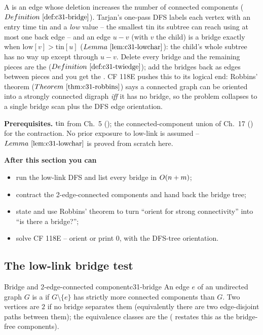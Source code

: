 \begin{topicintro}
A  is an edge whose deletion increases the number of connected
components (\(\defref{c31-bridge}\)).  Tarjan's one-pass DFS labels each vertex
with an entry time \(\mathrm{tin}\) and a \emph{low} value -- the smallest
\(\mathrm{tin}\) its subtree can reach using at most one back edge -- and an edge
\(u\!-\!v\) (with \(v\) the child) is a bridge exactly when
\(\mathrm{low}[v]>\mathrm{tin}[u]\) (\(\lemref{c31-lowchar}\)): the child's whole
subtree has no way up except through \(u\!-\!v\).  Delete every bridge and the
remaining pieces are the 
(\(\defref{c31-twiedge}\)); add the bridges back as edges between pieces and you
get the .  CF 118E pushes this to its logical end: Robbins'
theorem (\(\thmref{c31-robbins}\)) says a connected graph can be oriented into a
strongly connected digraph \emph{iff} it has no bridge, so the problem collapses
to a single bridge scan plus the DFS edge orientation.

\textbf{Prerequisites.} \(\operatorname{tin}\) from Ch.~5 (); the connected-component
union of Ch.~17 () for the contraction.  No prior exposure to
low-link is assumed -- \(\lemref{c31-lowchar}\) is proved from scratch here.

\textbf{After this section you can}
\begin{itemize}[nosep]
  \item run the low-link DFS and list every bridge in \(O(n+m)\); \hfill{}
  \item contract the 2-edge-connected components and hand back the bridge tree; \hfill{}
  \item state and use Robbins' theorem to turn ``orient for strong connectivity'' into ``is there a bridge?''; \hfill{}
  \item solve CF 118E -- orient or print \(0\), with the DFS-tree orientation. \hfill{}
\end{itemize}
\end{topicintro}

\subsection{The low-link bridge test}

\begin{definition}{Bridge and 2-edge-connected component}{c31-bridge}
An edge \(e\) of an undirected graph \(G\) is a  if
\(G\setminus\{e\}\) has strictly more connected components than \(G\).  Two
vertices are \(2\) if no bridge separates them (equivalently
there are two edge-disjoint paths between them); the equivalence classes are the
 ( restates this as the
bridge-free components).
\end{definition}

